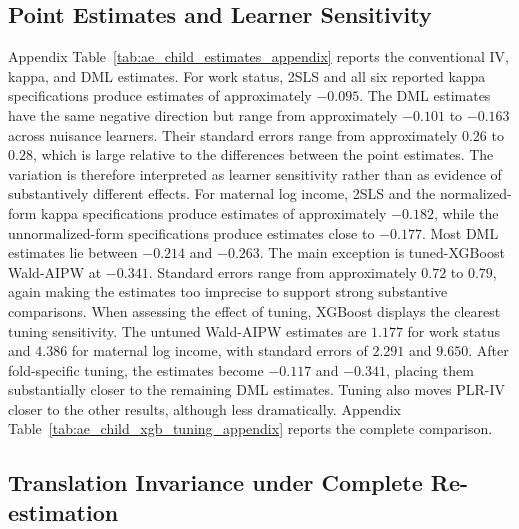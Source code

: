 \documentclass[12pt, a4paper, oneside]{article}
\theoremstyle{plain}
\theoremstyle{definition}
\begin{document}
\subsection{Point Estimates and Learner Sensitivity}
\label{subsec:child_estimates}


Appendix Table~\ref{tab:ae_child_estimates_appendix} reports the conventional IV, kappa, and DML estimates. For work status, 2SLS and all six reported kappa specifications produce estimates of approximately \(-0.095\).
The DML estimates have the same negative direction but range from approximately \(-0.101\) to \(-0.163\) across nuisance learners. Their standard errors range from approximately \(0.26\) to \(0.28\), which is large relative to the differences between the point estimates.
The variation is therefore interpreted as learner sensitivity rather than as evidence of substantively different effects.
For maternal log income, 2SLS and the normalized-form kappa specifications produce estimates of approximately \(-0.182\), while the unnormalized-form specifications produce estimates close to \(-0.177\). Most DML estimates lie between \(-0.214\) and \(-0.263\). The main exception is tuned-XGBoost Wald-AIPW at \(-0.341\). Standard errors range from approximately \(0.72\) to \(0.79\), again making the estimates too imprecise to support strong substantive comparisons.
When assessing the effect of tuning, XGBoost displays the clearest tuning sensitivity. The untuned Wald-AIPW estimates are \(1.177\) for work status and \(4.386\) for maternal log income, with standard errors of \(2.291\) and \(9.650\). After fold-specific tuning, the estimates become \(-0.117\) and \(-0.341\), placing them substantially closer to the remaining DML estimates. Tuning also moves PLR-IV closer to the other results, although less dramatically. Appendix Table~\ref{tab:ae_child_xgb_tuning_appendix} reports the complete comparison.








\subsection{Translation Invariance under Complete Re-estimation}
\label{subsec:child_translation}
\end{document}
